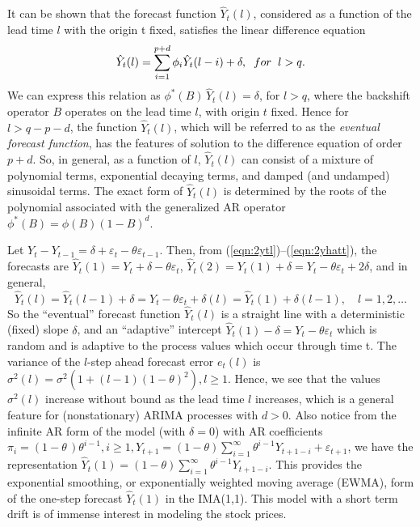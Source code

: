It can be shown that the forecast function $\hat{Y}_t(l)$, considered as a function of the lead time $l$ with the origin t fixed, satisfies the linear difference equation
	\begin{equation}\label{eqn:2twoyhat}
	\hat{Y}_t(l) = \sum_{i=1}^{p+d}\phi_i\hat{Y}_t(l-i) + \delta,\hspace{0.2cm}for\hspace{0.2cm}l > q.
	\end{equation}
We can express this relation as $\phi^*(B)\,\hat{Y}_t(l) = \delta$, for $l > q$, where the backshift operator $B$ operates on the lead time $l$, with origin $t$ fixed. Hence for $l > q-p-d$, the function $\hat{Y}_t(l)$, which will be referred to as the \textit{eventual forecast function}, has the features of solution to the difference equation of order $p+d$. So, in general, as a function of $l$, $\hat{Y}_t(l)$ can consist of a mixture of polynomial terms, exponential decaying terms, and damped (and undamped) sinusoidal terms. The exact form of $\hat{Y}_t(l)$ is determined by the roots of the polynomial associated with the generalized AR operator $\phi^*(B) = \phi(B)(1 - B)^d$. 


\begin{ex}
 Let $Y_t - Y_{t-1} = \delta + \varepsilon_t - \theta\varepsilon_{t-1}$. Then, from (\ref{eqn:2ytl})--(\ref{eqn:2yhatt}), the forecasts are $\hat{Y}_t(1) = Y_t + \delta -\theta\varepsilon_t$, $\hat{Y}_t(2) = Y_t(1) + \delta = Y_t -\theta\varepsilon_t + 2\delta$, and in general,
	\[
	\hat{Y}_t(l) = \hat{Y}_t(l-1) + \delta = Y_t - \theta\varepsilon_t + \delta(l) = \hat{Y}_t(1) + \delta(l-1),\quad l= 1,2,\ldots
	\]
So the ``eventual'' forecast function $\hat{Y}_t(l)$ is a straight line with a deterministic (fixed) slope $\delta$, and an ``adaptive'' intercept $\hat{Y}_t(1) - \delta = Y_t - \theta\varepsilon_t$ which is random and is adaptive to the process values which occur through time t. The variance of the $l$-step ahead forecast error $e_t(l)$ is $\sigma^2(l) = \sigma^2(1 + (l-1)(1-\theta)^2), l\geq1$. Hence, we see that the values $\sigma^2(l)$ increase without bound as the lead time $l$ increases, which is a general feature for (nonstationary) ARIMA processes with $d > 0$. Also notice from the infinite AR form of the model (with $\delta = 0$) with AR coefficients $\pi_i = (1-\theta\,)\theta^{i-1}, i\geq1, Y_{t+1} = (1-\theta)\sum_{i=1}^\infty\theta^{i-1}Y_{t+1-i} + \varepsilon_{t+1}$, we have the representation $\hat{Y}_t(1) = (1-\theta)\sum_{i=1}^\infty\theta^{i-1}Y_{t+1-i}$. This provides the exponential smoothing, or exponentially weighted moving average (EWMA), form of the one-step forecast $\hat{Y}_t(1)$ in the IMA(1,1). This model with a short term drift is of immense interest in modeling the stock prices.
\end{ex}



